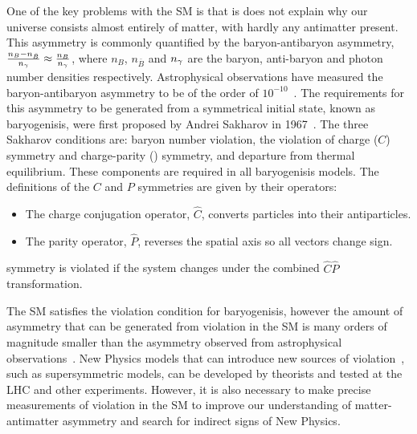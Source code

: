 One of the key problems with the SM is that is does not explain why our universe consists almost entirely of matter, with hardly any antimatter present. This asymmetry is commonly quantified by the baryon-antibaryon asymmetry, $\frac{n_{B} - n_{\bar{B}}}{n_{{\gamma}}} \approx \frac{n_{B}}{n_{{\gamma}}}$, where $n_{B}$, $n_{\bar{B}}$ and $n_{{\gamma}}$ are the baryon, anti-baryon and photon number densities respectively. Astrophysical observations have measured the baryon-antibaryon asymmetry to be of the order of $10^{-10}$~\cite{astrophysicalasy}. The requirements for this asymmetry to be generated from a symmetrical initial state, known as baryogenisis, were first proposed by Andrei Sakharov in 1967~\cite{sakharov}. The three Sakharov conditions are: baryon number violation, the violation of charge ($C$) symmetry and charge-parity (\CP) symmetry, and departure from thermal equilibrium. These components are required in all baryogenisis models. The definitions of the $C$ and $P$ symmetries are given by their operators:
\begin{itemize}
\item The charge conjugation operator, $\hat{C}$, converts particles into their antiparticles.
\item The parity operator, $\hat{P}$, reverses the spatial axis so all vectors change sign.
\end{itemize}
\CP symmetry is violated if the system changes under the combined $\hat{C}\hat{P}$ transformation.

The SM satisfies the \CP violation condition for baryogenisis, however the amount of asymmetry that can be generated from \CP violation in the SM is many orders of magnitude smaller than the asymmetry observed from astrophysical observations~\cite{SMasy}. New Physics models that can introduce new sources of \CP violation~\cite{BSMCP}, such as supersymmetric models, can be developed by theorists and tested at the LHC and other experiments. However, it is also necessary to make precise measurements of \CP violation in the SM to improve our understanding of matter-antimatter asymmetry and search for indirect signs of New Physics.

